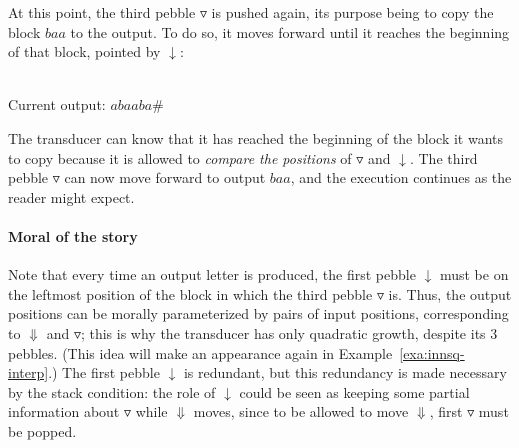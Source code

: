 \documentclass{fundam}
\theoremstyle{claimstyle}
\begin{document}
At this point, the third pebble $\triangledown$ is pushed again, its purpose
being to copy the block $baa$ to the output. To do so, it moves forward until it
reaches the beginning of that block, pointed by $\downarrow$:
\begin{center}
  \\
  Current output: $abaaba\#$
\end{center}
The transducer can know that it has reached the beginning of the block it wants
to copy because it is allowed to \emph{compare the positions} of $\triangledown$
and $\downarrow$. The third pebble $\triangledown$ can now move forward to
output $baa$, and the execution continues as the reader might expect.

\paragraph{Moral of the story}

Note that every time an output letter is produced, the first pebble $\downarrow$
must be on the leftmost position of the block in which the third pebble
$\triangledown$ is. Thus, the output positions can be morally parameterized by
pairs of input positions, corresponding to $\Downarrow$ and $\triangledown$;
this is why the transducer has only quadratic growth, despite its 3 pebbles.
(This idea will make an appearance again in Example~\ref{exa:innsq-interp}.) The
first pebble $\downarrow$ is redundant, but this redundancy is made necessary by
the stack condition: the role of $\downarrow$ could be seen as keeping some
partial information about $\triangledown$ while $\Downarrow$ moves, since to be
allowed to move $\Downarrow$, first $\triangledown$ must be popped.
\end{document}
